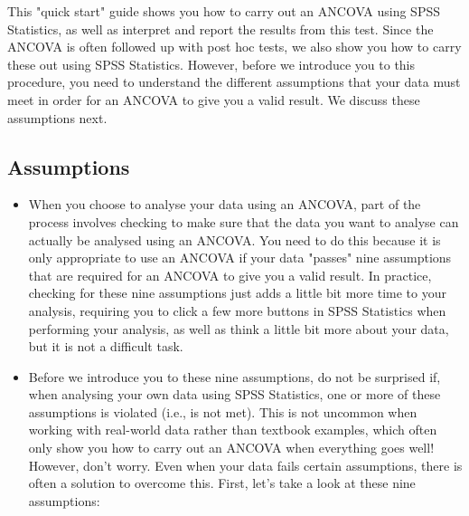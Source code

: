 This "quick start" guide shows you how to carry out an ANCOVA using SPSS Statistics, as well as interpret and report the results from this test. Since the ANCOVA is often followed up with post hoc tests, we also show you how to carry these out using SPSS Statistics. However, before we introduce you to this procedure, you need to understand the different assumptions that your data must meet in order for an ANCOVA to give you a valid result. We discuss these assumptions next.

\subsection{Assumptions}
\begin{itemize}
\item 
When you choose to analyse your data using an ANCOVA, part of the process involves checking to make sure that the data you want to analyse can actually be analysed using an ANCOVA. You need to do this because it is only appropriate to use an ANCOVA if your data "passes" nine assumptions that are required for an ANCOVA to give you a valid result. In practice, checking for these nine assumptions just adds a little bit more time to your analysis, requiring you to click a few more buttons in SPSS Statistics when performing your analysis, as well as think a little bit more about your data, but it is not a difficult task.
\item 
Before we introduce you to these nine assumptions, do not be surprised if, when analysing your own data using SPSS Statistics, one or more of these assumptions is violated (i.e., is not met). This is not uncommon when working with real-world data rather than textbook examples, which often only show you how to carry out an ANCOVA when everything goes well! However, don’t worry. Even when your data fails certain assumptions, there is often a solution to overcome this. First, let’s take a look at these nine assumptions:
\end{itemize}


